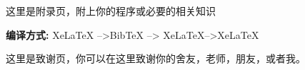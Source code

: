 \documentclass[AutoFakeBold]{LZUThesis2007}
\begin{document}
\backmatter


\printbib



\Appendix


这里是附录页，附上你的程序或必要的相关知识

{\bfseries 编译方式:} XeLaTeX -->BibTeX --> XeLaTeX-->XeLaTeX


\Thanks

这里是致谢页，你可以在这里致谢你的舍友，老师，朋友，或者我。








\Grade %
\end{document}
